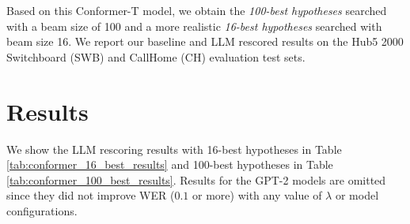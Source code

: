 \documentclass[a4paper]{article}
\begin{document}
Based on this Conformer-T model, we obtain the \textit{100-best hypotheses} searched with a beam size of 100 and a more realistic \textit{16-best hypotheses} searched with beam size 16. We report our baseline and LLM rescored results on the Hub5 2000 Switchboard (SWB) and CallHome (CH) evaluation test sets.

\section{Results}
\label{sec:results}

We show the LLM rescoring results with 16-best hypotheses in Table \ref{tab:conformer_16_best_results} and 100-best hypotheses in Table \ref{tab:conformer_100_best_results}. Results for the GPT-2 models are omitted since they did not improve WER ($0.1$ or more) with any value of $\lambda$ or model configurations.
\end{document}
